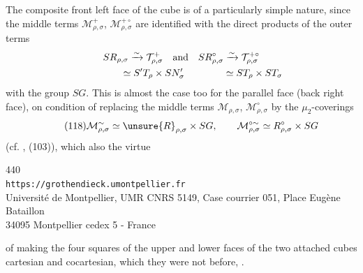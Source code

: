 The composite front left face of the cube is of a particularly simple nature, since the middle terms $\mathcal M_{\rho,\sigma}^{+}$, $\mathcal M_{\rho,\sigma}^{+\circ}$ are identified  with the direct products of the outer terms
\[
\begin{gathered}
SR_{\rho,\sigma}\xrightarrow{\sim}\mathcal T_{\rho,\sigma}^{+}
\quad\text{and}\quad
SR_{\rho,\sigma}^{\circ}\xrightarrow{\sim}\mathcal T_{\rho,\sigma}^{+\circ}\\
\hphantom{SR_{\rho,\sigma}\xrightarrow{\sim}}\simeq S'T_\rho\times SN'_\sigma
\qquad\qquad\simeq ST_\rho\times ST_\sigma
\end{gathered}
\]
with the group $SG$. This is almost the case too for the parallel face (back right face),  on condition of replacing the  middle terms $\mathcal M_{\rho,\sigma}$, $\mathcal M_{\rho,\sigma}^{\circ}$ by the $\mu_2$-coverings
\[
\tag{118}
\mathcal M_{\rho,\sigma}^{\sim}\simeq\unsure{R}_{\rho,\sigma}\times SG,
\qquad \mathcal M_{\rho,\sigma}^{\circ\sim}\simeq R_{\rho,\sigma}^{\circ}\times SG
\]
(cf. , (103)), which  also the virtue


\begin{center}
{\small
440\\
\texttt{https://grothendieck.umontpellier.fr}\\
Université de Montpellier, UMR CNRS 5149, Case courrier 051, Place Eugène Bataillon\\
34095 Montpellier cedex 5 - France
}
\end{center}


 of making the four squares of the upper and lower faces of the two attached cubes cartesian and cocartesian, which they were not before, .

